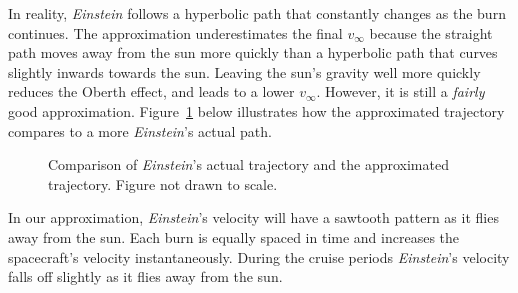 \documentclass[12pt]{article} %
\begin{document}
In reality, \textit{Einstein} follows a hyperbolic path that constantly changes as the burn continues. The approximation underestimates the final $v_{\infty}$ because the straight path moves away from the sun more quickly than a hyperbolic path that curves slightly inwards towards the sun. Leaving the sun's gravity well more quickly reduces the Oberth effect, and leads to a lower $v_{\infty}$. However, it is still a \textit{fairly} good approximation. Figure~\ref{fig:suntrajectory} below illustrates how the approximated trajectory compares to a more \textit{Einstein}'s actual path.

\begin{figure}[H]
	\caption{Comparison of \textit{Einstein}'s actual trajectory and the approximated trajectory. Figure not drawn to scale.}
	\label{fig:suntrajectory}
\end{figure}

In our approximation, \textit{Einstein}'s velocity will have a sawtooth pattern as it flies away from the sun. Each burn is equally spaced in time and increases the spacecraft's velocity instantaneously. During the cruise periods \textit{Einstein}'s velocity falls off slightly as it flies away from the sun.
\end{document}
